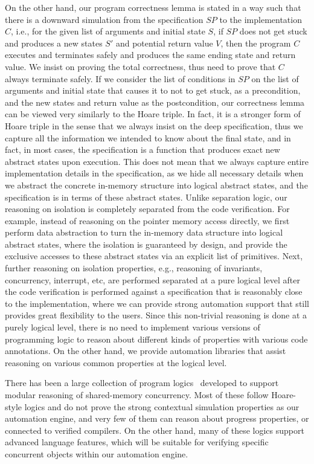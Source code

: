 On the other hand, our program correctness lemma is stated in a way such that there is a downward simulation from the specification $SP$
to the implementation $C$, i.e., for the given list of arguments and initial state $S$, if $SP$ does not get stuck and produces a new 
states $S'$ and potential return value $V$, then the program $C$ executes and terminates safely and produces the same ending state and return value.
We insist on proving the total correctness, thus need to prove that $C$ always terminate safely.
If we consider the list of conditions in $SP$ on the list of arguments and initial state that causes it to not to get stuck, as a precondition,
and the new states and return value as the postcondition, our correctness lemma can be viewed very similarly to the Hoare triple.
In fact, it is a stronger form of Hoare triple in the sense that we always insist on the deep specification, thus we capture all the information
we intended to know about the final state, and in fact, in most cases, the specification is a function that produces exact new abstract states upon 
execution. This does not mean that we always capture entire implementation details in the specification, as we hide all necessary details
when we abstract the concrete in-memory structure into logical abstract states, and the specification is in terms of these abstract states.
Unlike separation logic, our reasoning on isolation is completely separated from the code verification. For example, instead of reasoning
on the pointer memory access directly, we first perform data abstraction to turn the in-memory data structure into logical abstract states,
where the isolation is guaranteed by design, and provide the exclusive accesses to these abstract states via an explicit list of primitives.
Next, further reasoning on isolation properties, e.g., reasoning of invariants, concurrency, interrupt, etc, are performed separated
at a pure logical level after the code verification is performed against a specification that is reasonably close to the implementation,
where we can provide strong automation support that still provides great flexibility to the users.
Since this non-trivial reasoning is done at a purely logical level, there is no need to implement various versions of programming logic
to reason about different kinds of properties with various code annotations.
On the other hand, we provide automation libraries that assist reasoning on various common properties at the logical level. 

There has been a large collection of program
logics~\cite{ohearn:concur04,brookes:concur04,feng07:sagl,vafeiadis:marriage,LRG,verifast,gotsman13,CAP2010,Turon13popl,Turon13icfp,nanevski13,nanevski14,sergey15,sergey15pldi,pinto14,iris15,civl15,pinto16,xu16}
developed to support modular reasoning of shared-memory concurrency. 
Most of these follow Hoare-style logics and
do not prove the strong contextual simulation properties as our automation engine,
and very few of them can reason about progress properties, or connected to verified compilers.
On the other hand, many of these logics support advanced language features,
which will be suitable for verifying specific concurrent objects
within our automation engine.

